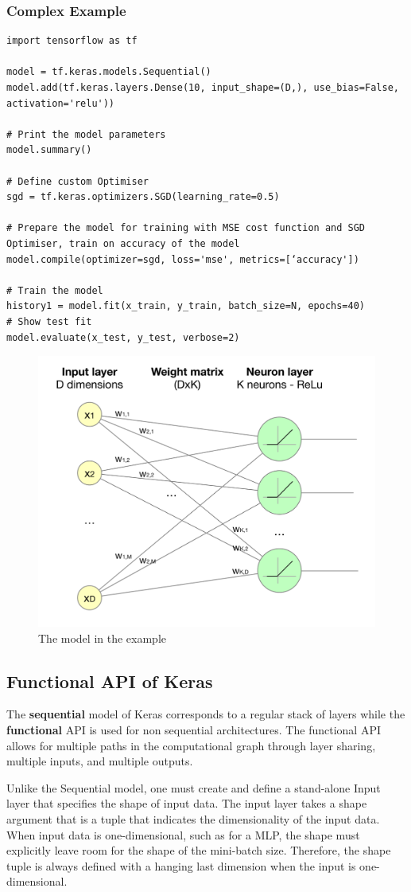 \documentclass[11pt]{article}
\begin{document}
\subsubsection{Complex Example}
\begin{verbatim}
import tensorflow as tf

model = tf.keras.models.Sequential()
model.add(tf.keras.layers.Dense(10, input_shape=(D,), use_bias=False, activation='relu'))

# Print the model parameters
model.summary()

# Define custom Optimiser
sgd = tf.keras.optimizers.SGD(learning_rate=0.5)

# Prepare the model for training with MSE cost function and SGD Optimiser, train on accuracy of the model
model.compile(optimizer=sgd, loss='mse', metrics=[‘accuracy'])

# Train the model
history1 = model.fit(x_train, y_train, batch_size=N, epochs=40)
# Show test fit
model.evaluate(x_test, y_test, verbose=2)
\end{verbatim}

\begin{figure}[tbh]
	\centering
	\includegraphics[width=0.5\linewidth,keepaspectratio]{keras_model_example}
	\caption{The model in the example}
	\label{fig:kerasmodelexample}
\end{figure}

\subsection{Functional API of Keras}
The \textbf{sequential} model of Keras corresponds to a regular stack of layers while the \textbf{functional} API is used for non sequential architectures. The functional API allows for multiple paths in the computational graph through layer sharing, multiple inputs, and multiple outputs.

Unlike the Sequential model, one must create and define a stand-alone Input layer that specifies the shape of input data. The input layer takes a shape argument that is a tuple that indicates the dimensionality of the input data. When input data is one-dimensional, such as for a MLP, the shape must explicitly leave room for the shape of the mini-batch size. Therefore, the shape tuple is always defined with a hanging last dimension when the input is one-dimensional. 
\end{document}
